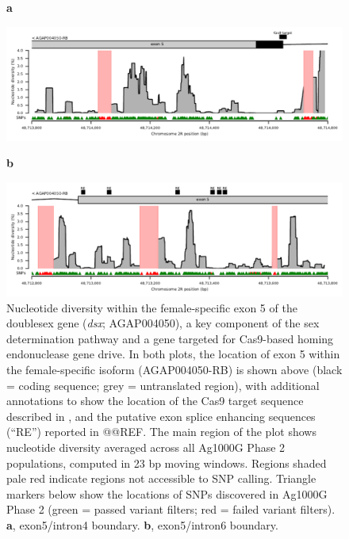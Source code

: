 \documentclass[a4paper,11pt,abstracton,hidelinks]{scrartcl}
\begin{document}
\clearpage

\begin{figure}[H]
    \textbf{a}
	\begin{center}
        \includegraphics[width=1.0\linewidth]{artwork/dsx_a.pdf}
	\end{center}
    \textbf{b}
	\begin{center}
        \includegraphics[width=1.0\linewidth]{artwork/dsx_b.pdf}
	\end{center}
    \caption{%
    Nucleotide diversity within the female-specific exon 5 of the doublesex gene (\textit{dsx}; AGAP004050), a key component of the sex determination pathway and a gene targeted for Cas9-based homing endonuclease gene drive.
    In both plots, the location of exon 5 within the female-specific isoform (AGAP004050-RB) is shown above (black = coding sequence; grey = untranslated region), with additional annotations to show the location of the Cas9 target sequence described in \cite{kyrou2018}, and the putative exon splice enhancing sequences (``RE'') reported in @@REF.
    The main region of the plot shows nucleotide diversity averaged across all Ag1000G Phase 2 populations, computed in 23 bp moving windows.
    Regions shaded pale red indicate regions not accessible to SNP calling.
    Triangle markers below show the locations of SNPs discovered in Ag1000G Phase 2 (green = passed variant filters; red = failed variant filters).
    \textbf{a}, exon5/intron4 boundary.
    \textbf{b}, exon5/intron6 boundary.
}
    \label{fig:dsx}
\end{figure}
\end{document}
